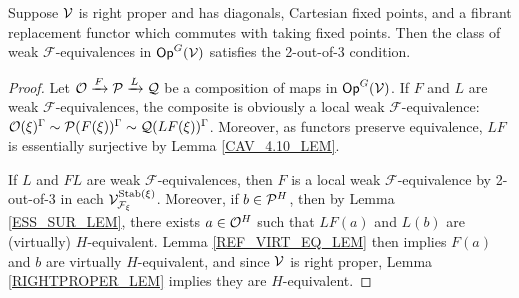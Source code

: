 \documentclass[a4paper,10pt
,draft
]{article}%
\renewcommand{\F}{\mathcal F}
\newcommand{\J}{\mathbb J}
\newcommand{\Q}{\mathcal Q}
\renewcommand{\1}{\ensuremath{\mathbb{id}}}
\begin{document}
 
\begin{proposition}
      \label{CAV_4.15_PROP}
      Suppose $\V$ is right proper and has diagonals, Cartesian fixed points,
      and a fibrant replacement functor which commutes with taking fixed points.
      Then the class of weak $\F$-equivalences in $\mathsf{Op}^G(\V)$ satisfies the 2-out-of-3 condition.
\end{proposition}
\begin{proof}
      Let $\O \xrightarrow{F} \P \xrightarrow{L} \Q$ be a composition of maps in $\mathsf{Op}^G(\V)$.
      If $F$ and $L$ are weak $\F$-equivalences,
      the composite is obviously a local weak $\F$-equivalence:
      $\O(\ksi)^\Gamma \sim \P(F(\ksi))^\Gamma \sim \Q(LF(\ksi))^\Gamma$.
      Moreover, as functors preserve equivalence, $L F$ is essentially surjective by Lemma \ref{CAV_4.10_LEM}. 
      
      If $L$ and $FL$ are weak $\F$-equivalences,
      then $F$ is a local weak $\F$-equivalence by 2-out-of-3 in each $\V^{\Stab(\ksi)}_{\F_\ksi}$.
      Moreover, if $b \in \P^H$, then by Lemma \ref{ESS_SUR_LEM}, there exists $a \in \O^H$ such that
      $LF(a)$ and $L(b)$ are (virtually) $H$-equivalent.
      Lemma \ref{REF_VIRT_EQ_LEM} then implies $F(a)$ and $b$ are virtually $H$-equivalent, 
      and since $\V$ is right proper, Lemma \ref{RIGHTPROPER_LEM} implies they are $H$-equivalent.


\end{proof}
\end{document}
